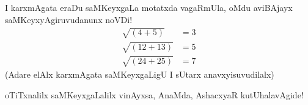 I karxmAgata eraDu saMKeyxgaLa motatxda vagaRmUla, oMdu aviBAjayx saMKeyxyAgiruvudanunx noVDi!
\begin{align*}
  \sqrt{(4+5)} & = 3\\
  \sqrt{(12+13)} & = 5\\
  \sqrt{(24+25)} &= 7
\end{align*}
(Adare elAlx karxmAgata saMKeyxgaLigU I sUtarx anavxyisuvudilalx)

oTiTxnalilx saMKeyxgaLalilx vinAyxsa, AnaMda, AshacxyaR kutUhalavAgide! 



